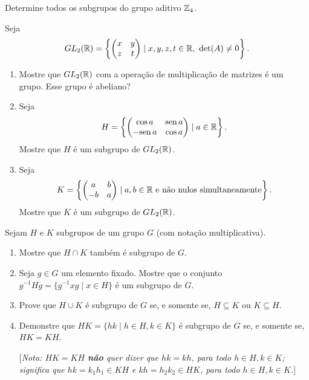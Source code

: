 \documentclass[12pt]{exam}
\begin{document}
    \vspace{.3cm}

    \questao{} Determine todos os subgrupos do grupo aditivo $\mathbb{Z}_4$.

    \vspace{.3cm}

    \questao{} Seja
    \[
      GL_2(\mathbb{R}) = \left\{ \begin{pmatrix}
          x & y\\z & t
      \end{pmatrix} \mid x, y, z, t \in \mathbb{R},\ \det(A) \ne 0\right\}.
    \]
    \begin{enumerate}[label=({\alph*})]
      \item Mostre que $GL_2(\mathbb{R})$ com a opera\c{c}\~ao de multiplica\c{c}\~ao de matrizes \'e um grupo. Esse grupo \'e abeliano?

      \item Seja
      \[
          H = \left\{ \begin{pmatrix}
              \cos a & {\rm sen\,} a\\ - {\rm sen\,} a & \cos a
          \end{pmatrix} \mid a \in \mathbb{R}\right\}.
      \]
      Mostre que $H$ \'e um subgrupo de $GL_2(\mathbb{R})$.

      \item Seja
      \[
          K = \left\{ \begin{pmatrix}
              a & b\\ -b & a
          \end{pmatrix} \mid a, b \in \mathbb{R} \mbox{ e n\~ao nulos simultaneamente}\right\}.
      \]
      Mostre que $K$ \'e um subgrupo de $GL_2(\mathbb{R})$.
    \end{enumerate}

    \questao{} Sejam $H$ e $K$ subgrupos de um grupo $G$ (com nota{\c c}{\~a}o
    multiplicativa).
    \begin{enumerate}[label=({\alph*})]
      \item Mostre que $H\cap K$ tamb{\'e}m {\'e} subgrupo de $G$.

      \item Seja $g\in G$ um elemento fixado. Mostre que o conjunto
      $g^{-1}Hg=\{ g^{-1}xg \mid x\in H \} $ {\'e} um subgrupo de $G$.

      \item Prove que $H\cup K$ {\'e} subgrupo de $G$ se, e somente se,
      $H\subseteq K$ ou $K\subseteq H$.

      \item Demonstre que $HK=\{hk \mid h\in H, k\in K\}$ {\'e} subgrupo
      de $G$ se, e somente se, $HK=KH$.

      [\emph{Nota: $HK=KH$ \textbf{n{\~a}o} quer dizer que $hk=kh$,
      para todo $h\in H, k\in K$; significa que $hk=k_1h_1 \in KH$ e $kh=h_2k_2 \in
      HK$, para todo $h\in H, k\in K$.}]
    \end{enumerate}
\end{document}
